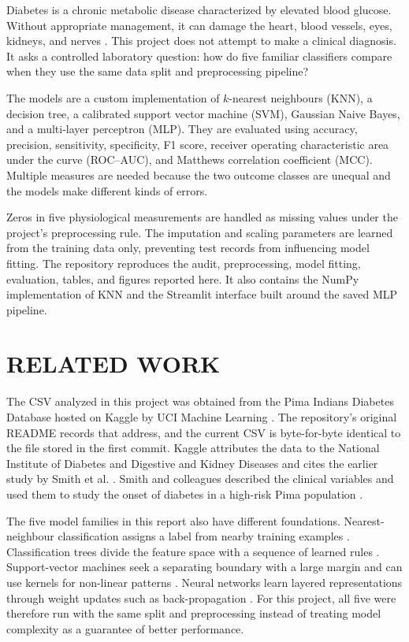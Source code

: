 \documentclass[pdflatex,sn-vancouver-num]{sn-jnl}
\begin{document}
Diabetes is a chronic metabolic disease characterized by elevated blood glucose. Without appropriate management, it can damage the heart, blood vessels, eyes, kidneys, and nerves \cite{who2024diabetes}. This project does not attempt to make a clinical diagnosis. It asks a controlled laboratory question: how do five familiar classifiers compare when they use the same data split and preprocessing pipeline?

The models are a custom implementation of $k$-nearest neighbours (KNN), a decision tree, a calibrated support vector machine (SVM), Gaussian Naive Bayes, and a multi-layer perceptron (MLP). They are evaluated using accuracy, precision, sensitivity, specificity, F1 score, receiver operating characteristic area under the curve (ROC--AUC), and Matthews correlation coefficient (MCC). Multiple measures are needed because the two outcome classes are unequal and the models make different kinds of errors.

Zeros in five physiological measurements are handled as missing values under the project's preprocessing rule. The imputation and scaling parameters are learned from the training data only, preventing test records from influencing model fitting. The repository reproduces the audit, preprocessing, model fitting, evaluation, tables, and figures reported here. It also contains the NumPy implementation of KNN and the Streamlit interface built around the saved MLP pipeline.

\section{RELATED WORK}\label{sec:related}

The CSV analyzed in this project was obtained from the Pima Indians Diabetes Database hosted on Kaggle by UCI Machine Learning \cite{uciKagglePima}. The repository's original README records that address, and the current CSV is byte-for-byte identical to the file stored in the first commit. Kaggle attributes the data to the National Institute of Diabetes and Digestive and Kidney Diseases and cites the earlier study by Smith et al. \cite{uciKagglePima}. Smith and colleagues described the clinical variables and used them to study the onset of diabetes in a high-risk Pima population \cite{smith1988adap}.

The five model families in this report also have different foundations. Nearest-neighbour classification assigns a label from nearby training examples \cite{cover1967nearest}. Classification trees divide the feature space with a sequence of learned rules \cite{breiman1984cart}. Support-vector machines seek a separating boundary with a large margin and can use kernels for non-linear patterns \cite{cortes1995svm}. Neural networks learn layered representations through weight updates such as back-propagation \cite{rumelhart1986backprop}. For this project, all five were therefore run with the same split and preprocessing instead of treating model complexity as a guarantee of better performance.
\end{document}
